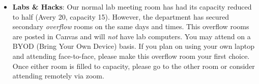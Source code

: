 \documentclass[12pt]{scrartcl}
\begin{document}
\begin{itemize}
  \item \textbf{Labs \& Hacks}: Our normal lab meeting
  room has had its capacity reduced to half (Avery 20, capacity 15).  
  However, the department has secured secondary \emph{overflow} rooms 
  on the same days and times.  This overflow rooms are posted in 
  Canvas and will \emph{not} have lab computers.  You may attend
  on a BYOD (Bring Your Own Device) basis.  If you plan on using 
  your own laptop and attending face-to-face, 
  please make this overflow room your first choice.  Once either
  room is filled to capacity, please go to the other room or 
  consider attending remotely via zoom.
  
%  



\end{itemize}
\end{document}
